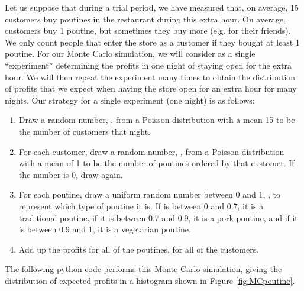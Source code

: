 Let us suppose that during a trial period, we have measured that, on average, 15 customers buy poutines in the restaurant during this extra hour. On average, customers buy 1 poutine, but sometimes they buy more (e.g. for their friends). We only count people that enter the store as a customer if they bought at least 1 poutine. For our Monte Carlo simulation, we will consider as a single ``experiment'' determining the profits in one night of staying open for the extra hour. We will then repeat the experiment many times to obtain the distribution of profits that we expect when having the store open for an extra hour for many nights. Our strategy for a single experiment (one night) is as follows:
\begin{enumerate}
\item Draw a random number, , from a Poisson distribution with a mean 15 to be the number of customers that night.
\item For each customer, draw a random number, , from a Poisson distribution with a mean of 1 to be the number of poutines ordered by that customer. If the number is 0, draw again. 
\item For each poutine, draw a uniform random number between 0 and 1, , to represent which type of poutine it is. If  is between 0 and 0.7, it is a traditional poutine, if it is between 0.7 and 0.9, it is a pork poutine, and if it is between 0.9 and 1, it is a vegetarian poutine.
\item Add up the profits for all of the poutines, for all of the customers.
\end{enumerate}

The following python code performs this Monte Carlo simulation, giving the distribution of expected profits in a histogram shown in Figure \ref{fig:MCpoutine}.


